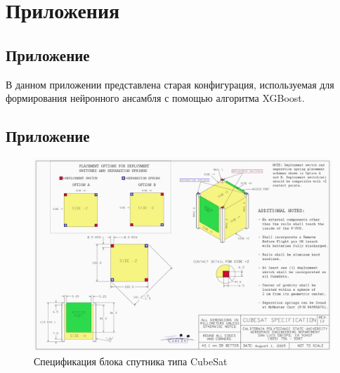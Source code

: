 \renewcommand{\chaptermark}[1]{\markboth{}{}}
\renewcommand{\sectionmark}[1]{\markright{\arabic{section}.\ #1}}

\titleformat{\section}[block]{\large\bfseries\filcenter}{}{0em}{}
\chapter*{Приложения}

\section{Приложение }
\label{subsec:old_polaris_learn_config}

В данном приложении представлена старая конфигурация, используемая для формирования нейронного ансамбля с помощью алгоритма XGBoost.

%

\section{Приложение }
\label{subsec:attachement_cubesat_design}

\begin{figure}
	\centering
	\includegraphics[width=1.0\linewidth]{img/cubesat_design.png}
	\caption{Спецификация блока спутника типа CubeSat}
\end{figure}




